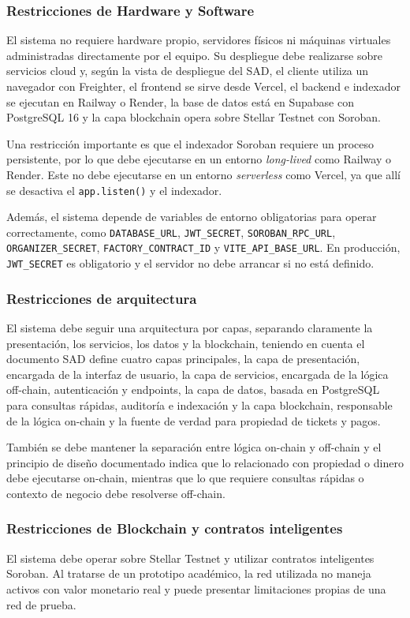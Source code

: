 \documentclass[12pt,letterpaper]{article}
\begin{document}
\subsubsection{Restricciones de Hardware y Software}
El sistema no requiere hardware propio, servidores físicos ni máquinas virtuales
administradas directamente por el equipo. Su despliegue debe realizarse sobre
servicios cloud y, según la vista de despliegue del SAD, el cliente utiliza un
navegador con Freighter, el frontend se sirve desde Vercel, el backend e
indexador se ejecutan en Railway o Render, la base de datos está en Supabase con
PostgreSQL 16 y la capa blockchain opera sobre Stellar Testnet con Soroban.

Una restricción importante es que el indexador Soroban requiere un proceso
persistente, por lo que debe ejecutarse en un entorno \textit{long-lived} como
Railway o Render. Este no debe ejecutarse en un entorno \textit{serverless} como
Vercel, ya que allí se desactiva el \texttt{app.listen()} y el indexador.

Además, el sistema depende de variables de entorno obligatorias para operar
correctamente, como \texttt{DATABASE\_URL}, \texttt{JWT\_SECRET},
\texttt{SOROBAN\_RPC\_URL}, \texttt{ORGANIZER\_SECRET},
\texttt{FACTORY\_CONTRACT\_ID} y \texttt{VITE\_API\_BASE\_URL}. En producción,
\texttt{JWT\_SECRET} es obligatorio y el servidor no debe arrancar si no está
definido.

\subsubsection{Restricciones de arquitectura}
El sistema debe seguir una arquitectura por capas, separando claramente la presentación, los servicios, los datos y la blockchain, teniendo en cuenta el documento SAD define cuatro capas principales, la capa de presentación, encargada de la interfaz de usuario, la capa de servicios, encargada de la lógica off-chain, autenticación y endpoints, la capa de datos, basada en PostgreSQL para consultas rápidas, auditoría e indexación y la capa blockchain, responsable de la lógica on-chain y la fuente de verdad para propiedad de tickets y pagos.

También se debe mantener la separación entre lógica on-chain y off-chain y el principio de diseño documentado indica que lo relacionado con propiedad o dinero debe ejecutarse on-chain, mientras que lo que requiere consultas rápidas o contexto de negocio debe resolverse off-chain.

\subsubsection{Restricciones de Blockchain y contratos inteligentes}
El sistema debe operar sobre Stellar Testnet y utilizar contratos inteligentes
Soroban. Al tratarse de un prototipo académico, la red utilizada no maneja activos
con valor monetario real y puede presentar limitaciones propias de una red de prueba.
\end{document}
